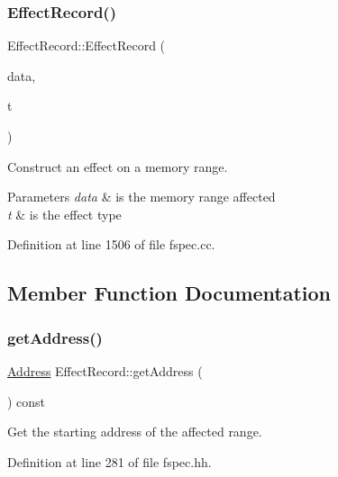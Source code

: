 \subsubsection{\texorpdfstring{EffectRecord()}{EffectRecord()}\hspace{0.1cm}{\footnotesize\ttfamily [5/5]}}
{\footnotesize\ttfamily Effect\+Record\+::\+Effect\+Record (\begin{DoxyParamCaption}\item[{const \mbox{\hyperlink{struct_varnode_data}{Varnode\+Data}} \&}]{data,  }\item[{uint4}]{t }\end{DoxyParamCaption})}



Construct an effect on a memory range. 


\begin{DoxyParams}{Parameters}
{\em data} & is the memory range affected \\
\hline
{\em t} & is the effect type \\
\hline
\end{DoxyParams}


Definition at line 1506 of file fspec.\+cc.



\subsection{Member Function Documentation}
\mbox{\label{class_effect_record_a121118c3ba7a9efc73b04ce710af8dfe}} 
\subsubsection{\texorpdfstring{getAddress()}{getAddress()}}
{\footnotesize\ttfamily \mbox{\hyperlink{class_address}{Address}} Effect\+Record\+::get\+Address (\begin{DoxyParamCaption}\item[{void}]{ }\end{DoxyParamCaption}) const\hspace{0.3cm}{\ttfamily [inline]}}



Get the starting address of the affected range. 



Definition at line 281 of file fspec.\+hh.

